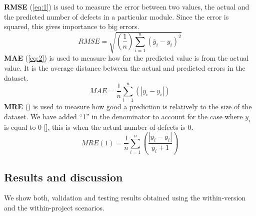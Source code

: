 \documentclass[]{article}
\begin{document}
	\textbf{RMSE} (\autoref{eq:1}) is used to measure the error between two values, the actual and the predicted number of defects in a particular module. Since the error is squared, this gives importance to big errors. \\
	\begin{equation}
	RMSE = \sqrt{(\frac{1}{n})\sum_{i=1}^{n}(\overline{y}_{i} - y_{i})^{2}} \label{eq:1}
	\end{equation}\break
	\indent \textbf{MAE} (\autoref{eq:2}) is used to measure how far the predicted value is from the actual value. It is the average distance between the actual and predicted errors in the dataset.\\
	\begin{equation}
	MAE = \displaystyle\frac{1}{n}\sum_{i=1}^{n}(|\overline{y}_{i} - y_{i}|) \label{eq:2}
	\end{equation}
	\indent \textbf{MRE} () is used to measure how good a prediction is relatively to the size of the dataset. We have added ``1'' in the denominator to account for the case where ${y}_{i} $ is equal to 0 [], this is when the actual number of defects is 0.\\
		\begin{equation}
		MRE(1) = \displaystyle\frac{1}{n}\sum_{i=1}^{n}(\frac{|y_{i} - \overline{y}_{i}|}{y_{i}+1}) \label{eq:3}
		\end{equation}
	\FloatBarrier
	\subsection{Results and discussion}
	We show both, validation and testing results obtained using the within-version and the within-project scenarios.
\end{document}
